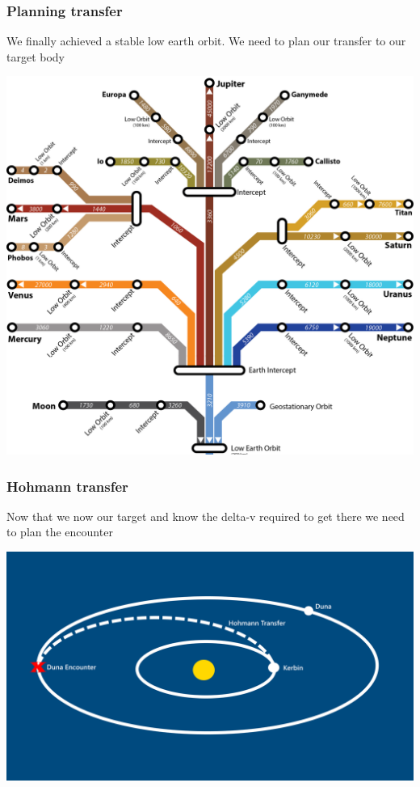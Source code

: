 \begin{frame}
    \frametitle{Planning transfer}
    \begin{block}{}
        We finally achieved a stable low earth orbit. We need to plan our transfer to our target body
    \end{block}
\end{frame}
\begin{frame}
    \begin{center}
        \includegraphics[height=\textheight]{images/deltavmap.png}
    \end{center}
\end{frame}
\begin{frame}
    \frametitle{Hohmann transfer}
    \begin{block}{}
        Now that we now our target and know the delta-v required to get there we need to plan the encounter
    \end{block}
    \begin{block}{}
        \begin{center}
            \includegraphics[scale=0.2]{images/hohmann_transfer}
        \end{center}
    \end{block}
\end{frame}
